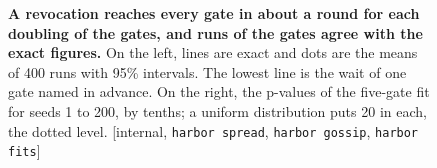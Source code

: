 \begin{figure}[H]
\caption{\textbf{A revocation reaches every gate in about a round for each
doubling of the gates, and runs of the gates agree with the exact figures.}
On the left, lines are exact and dots are the means of 400 runs with 95\%
intervals. The lowest line is the wait of one gate named in advance. On the
right, the p-values of the five-gate fit for seeds 1 to 200, by tenths; a
uniform distribution puts 20 in each, the dotted level. [internal, \texttt{harbor spread}, \texttt{harbor gossip},
\texttt{harbor fits}]}
\label{fig:anchor-gossip-rounds}
\end{figure}
